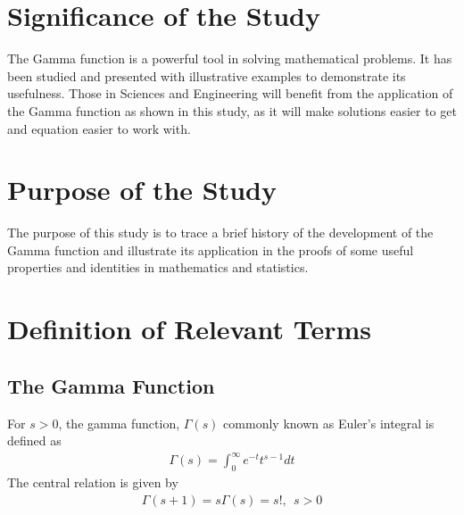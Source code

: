 \documentclass[11pt]{report}
\newcommand{\dsp}{\displaystyle}
\begin{document}
	\section{Significance of the Study}
	The Gamma function is a powerful tool in solving mathematical problems. It has been studied and presented with illustrative examples to demonstrate its usefulness. Those in Sciences and Engineering will benefit from the application of the Gamma function as shown in this study, as it will make solutions easier to get and equation easier to work with.
	
	\section{Purpose of the Study}
	The purpose of this study is to trace a brief history of the development of the Gamma function and illustrate its application in the proofs of some useful properties and identities in mathematics and statistics.
	
	\section{Definition of Relevant Terms}
	\subsection{The Gamma Function}
	For $s>0$, the gamma function, $\dsp \Gamma(s)$ commonly known as Euler's integral is defined as
	\begin{eqnarray}
		\Gamma(s) = \int_0^\infty e^{-t}t^{s-1}dt\label{eq:1_1}
	\end{eqnarray}
	The central relation is given by
	\begin{eqnarray}
		\Gamma(s+1) = s\Gamma(s) = s!,~~ s>0 \label{eq:1_2}
	\end{eqnarray}
	
\end{document}
